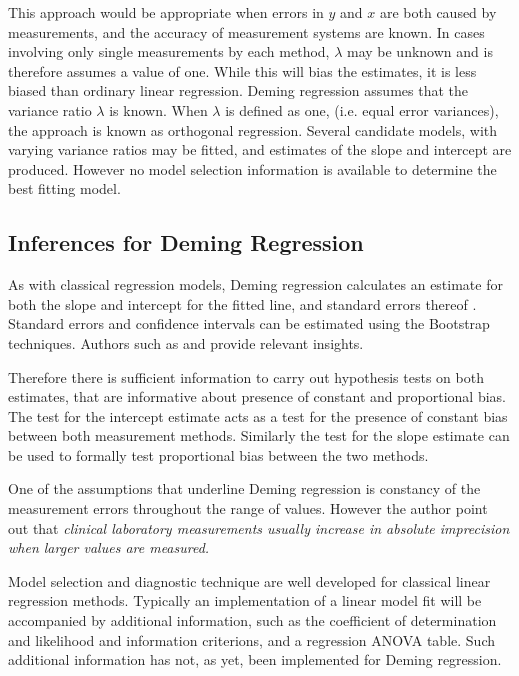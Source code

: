 \documentclass[12pt, a4paper]{report}
\theoremstyle{plain}
\theoremstyle{definition}
\theoremstyle{remark}
\begin{document}
This approach would be appropriate when errors in $y$ and $x$ are both caused by measurements, and the accuracy of measurement systems are known. In cases involving only single measurements by each method, $\lambda$ may be unknown and is therefore assumes a value of one. While this will bias the estimates, it is less biased than ordinary linear regression. Deming regression assumes that the variance ratio $\lambda$ is known. When $\lambda$ is defined as one, (i.e. equal error variances), the approach is known as orthogonal regression. Several candidate models, with varying variance ratios may be fitted, and estimates of the slope and intercept are produced. However no model selection information is available to determine the best fitting model.

\subsection{Inferences for Deming Regression}
As with classical regression models, Deming regression calculates an estimate for both the slope and intercept for the fitted line, and standard errors thereof  \citet{CornCoch}. Standard errors and confidence intervals can be estimated using the Bootstrap techniques. Authors such as \citet{carpenter2000bootstrap} and \citet{johnson2001bootstrap} provide relevant insights. 

Therefore there is sufficient information to carry out hypothesis tests on both estimates, that are informative about presence of constant and proportional bias. The test for the intercept estimate acts as a test for the presence of constant bias between both measurement methods. Similarly the test for the slope estimate can be used to formally test proportional bias between the two methods.

One of the assumptions that underline Deming regression is constancy of the measurement errors throughout the range of values.
However the author point out that \emph{clinical laboratory measurements usually increase in absolute imprecision when larger values are measured.}

Model selection and diagnostic technique are well developed for classical linear regression methods. Typically an implementation of a linear model fit will be accompanied by additional information, such as the coefficient of determination and likelihood and information criterions, and a regression ANOVA table. Such additional information has not, as yet, been implemented for Deming regression.
\end{document}
